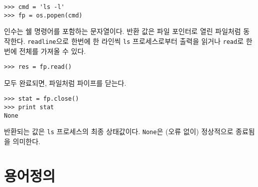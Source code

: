 
\beforeverb
\begin{verbatim}
>>> cmd = 'ls -l'
>>> fp = os.popen(cmd)
\end{verbatim}
\afterverb
%

인수는 쉘 명령어를 포함하는 문자열이다. 반환 값은 파일 포인터로 열린 파일처럼 동작한다.
{\tt readline}으로 한번에 한 라인씩 {\tt ls} 프로세스로부터 출력을 읽거나 
{\tt read}로 한번에 전체를 가져올 수 있다.


\beforeverb
\begin{verbatim}
>>> res = fp.read()
\end{verbatim}
\afterverb
%

모두 완료되면, 파일처럼 파이프를 닫는다.


\beforeverb
\begin{verbatim}
>>> stat = fp.close()
>>> print stat
None
\end{verbatim}
\afterverb
%

반환되는 값은 {\tt ls} 프로세스의 최종 상태값이다. {\tt None}은 (오류 없이) 정상적으로 종료됨을 의미한다.

\section{용어정의}

